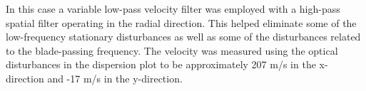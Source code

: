 In this case a variable low-pass velocity filter was employed with a high-pass spatial filter operating in the radial direction.
This helped eliminate some of the low-frequency stationary disturbances as well as some of the disturbances related to the blade-passing frequency.
The velocity was measured using the optical disturbances in the dispersion plot to be approximately 207 m/s in the x-direction and -17 m/s in the y-direction.
